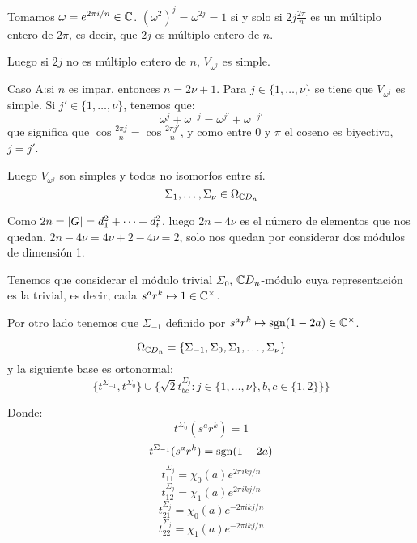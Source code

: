 Tomamos \(\omega =e^{2\pi i/n}\in\mathbb{C}\).
\({(\omega^2)}^j=\omega^{2j}=1\) si y solo si \(2j\frac{2\pi}{n}\)
es un múltiplo entero de \(2\pi\), es decir, que \(2j\) es múltiplo
entero de \(n\).

Luego si \(2j\) no es múltiplo entero de \(n\), \(V_{\omega^j}\) es
simple.

Caso A:\@ si \(n\) es impar, entonces \(n=2\nu+1\). Para
\(j\in\{1,\ldots,\nu\} \) se tiene que \(V_{\omega^j}\) es simple.
Si \(j'\in\{1,\ldots,\nu\} \), tenemos que:
\[
  \omega^j+\omega^{-j}
  =
  \omega^{j'}+\omega^{-j'}
\]
que significa que \(\cos\frac{2\pi j}{n}=\cos\frac{2\pi j'}{n}\), y como
entre 0 y \(\pi\) el coseno es biyectivo, \(j=j'\).

Luego \(V_{\omega^j}\) son simples y todos no isomorfos entre sí.
\[
  \Sigma_1,\ldots,\Sigma_\nu\in\Omega_{\mathbb{C} D_n}
\]

Como \(2n=\left|G\right|=d_1^2+\cdots+d_t^2\), luego \(2n-4\nu\) es el número
de elementos que nos quedan. \(2n-4\nu=4\nu+2-4\nu=2\), solo nos quedan por
considerar dos módulos de dimensión 1.

Tenemos que considerar el módulo trivial \(\Sigma_0\),
\(\mathbb{C} D_n\)-módulo cuya representación es la trivial, es decir,
cada \(s^a r^k\mapsto 1\in\mathbb{C}^\times\).

Por otro lado tenemos que \(\Sigma_{-1}\) definido por
\(s^a r^k\mapsto \operatorname{sgn}(1-2a)\in\mathbb{C}^\times\).

\[
  \Omega_{\mathbb{C} D_n}=
  \{\Sigma_{-1},\Sigma_0,\Sigma_1,\ldots,\Sigma_\nu\}
\]
y la siguiente base es ortonormal:
\[
  \{
    t^{\Sigma_{-1}},t^{\Sigma_0}\}\cup\{\sqrt{2}t^{\Sigma_j}_{bc}:
  j\in\{1,\ldots,\nu\}, b,c\in\{1,2\}\}
  \}
\]

Donde:
\[
  t^{\Sigma_0}(s^a r^k)=1
\]
\[
  t^{\Sigma_{-1}}(s^a r^k)=\operatorname{sgn}(1-2a)
\]
\[
  t^{\Sigma_j}_{11}
  = \chi_0(a)e^{2\pi i kj/n}
\]
\[
  t^{\Sigma_j}_{12}
  = \chi_1(a)e^{2\pi i kj/n}
\]
\[
  t^{\Sigma_j}_{21}
  = \chi_0(a)e^{-2\pi i kj/n}
\]
\[
  t^{\Sigma_j}_{22}
  = \chi_1(a)e^{-2\pi i kj/n}
\]

